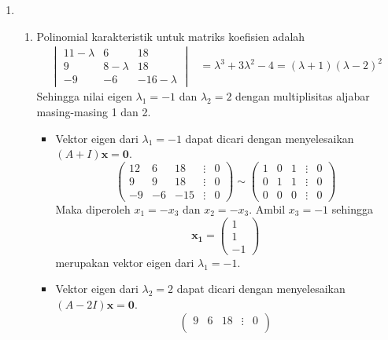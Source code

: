 \documentclass[a4paper]{article}
\theoremstyle{definisi}
\numberwithin{equation}{section}
\begin{document}
  \begin{enumerate}
    \item \begin{enumerate}
      \item Polinomial karakteristik untuk matriks koefisien adalah
      \begin{align*}
        \begin{vmatrix}
          11-\lambda&6&18\\
          9&8-\lambda&18\\
          -9&-6&-16-\lambda
        \end{vmatrix}&=\lambda^3+3\lambda^2-4=(\lambda+1)(\lambda-2)^2
      \end{align*}
      Sehingga nilai eigen $\lambda_1=-1$ dan $\lambda_2=2$ dengan multiplisitas aljabar masing-masing 1 dan 2.
      \begin{itemize}
        \item Vektor eigen dari $\lambda_1=-1$ dapat dicari dengan menyelesaikan $(A+I)\mathbf{x}=\mathbf{0}$.
        \begin{equation*}
          \begin{pmatrix}
            12&6&18&\vdots&0\\
            9&9&18&\vdots&0\\
            -9&-6&-15&\vdots&0
          \end{pmatrix}\sim
          \begin{pmatrix}
            1&0&1&\vdots&0\\
            0&1&1&\vdots&0\\
            0&0&0&\vdots&0
          \end{pmatrix}
        \end{equation*}
        Maka diperoleh $x_1=-x_3$ dan $x_2=-x_3$. Ambil $x_3=-1$ sehingga
        \begin{equation*}
          \mathbf{x_1}=\begin{pmatrix}
            1\\1\\-1
          \end{pmatrix}
        \end{equation*}
        merupakan vektor eigen dari $\lambda_1=-1$.
        \item Vektor eigen dari $\lambda_2=2$ dapat dicari dengan menyelesaikan $(A-2I)\mathbf{x}=\mathbf{0}$.
        \begin{equation*}
          \begin{pmatrix}
            9&6&18&\vdots&0\\

\end{pmatrix}
\end{equation*}
\end{itemize}
\end{enumerate}
\end{enumerate}
\end{document}
